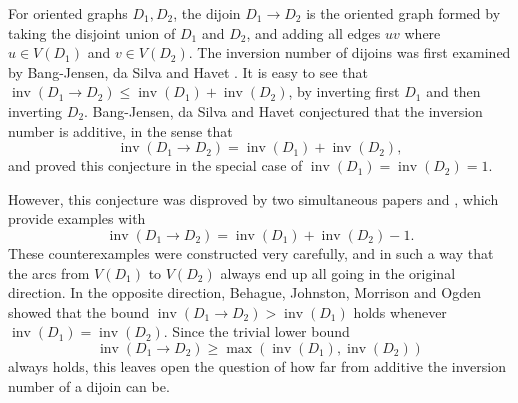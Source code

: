 \documentclass[10pt,a4paper]{amsart}
\numberwithin{equation}{section}
\theoremstyle{plain}
\theoremstyle{remark}
\theoremstyle{definition}
\newcommand{\inv}{\operatorname{inv}}
\begin{document}
For oriented graphs $D_1, D_2$, the dijoin $D_1 \to D_2$ is the oriented graph formed by taking the disjoint union of $D_1$ and $D_2$, and adding all edges $uv$ where $u \in V(D_1)$ and $v \in V(D_2)$. The inversion number of dijoins was first examined by Bang-Jensen, da Silva and Havet \cite{Bang}. It is easy to see that $ \inv(D_1 \to D_2) \leq \inv(D_1) + \inv(D_2)$, by inverting first $D_1$ and then inverting $D_2$. Bang-Jensen, da Silva and Havet \cite{Bang} conjectured that the inversion number is additive, in the sense that
\begin{equation}\label{eq:inv_additivity_conj}
    \inv(D_1 \to D_2) = \inv(D_1) + \inv(D_2),
\end{equation}
and proved this conjecture in the special case of $\inv(D_1) = \inv(D_2) = 1$.

However, this conjecture was disproved by two simultaneous papers \cite{Alon} and \cite{Problems}, which provide examples with
\begin{equation*}
    \inv(D_1 \to D_2) = \inv(D_1) + \inv(D_2) -1.
\end{equation*}
These counterexamples were constructed very carefully, and in such a way that the arcs from $V(D_1)$ to $V(D_2)$ always end up all going in the original direction. In the opposite direction, Behague, Johnston, Morrison and Ogden \cite{Natnote} showed that the bound $\inv(D_1\to D_2)> \inv(D_1)$ holds whenever $\inv(D_1) = \inv(D_2)$. Since the trivial lower bound
\begin{equation*}
    \inv(D_1 \to D_2) \geq \max( \inv(D_1),\inv(D_2))
\end{equation*}
always holds, this leaves open the question of how far from additive the inversion number of a dijoin can be.
\end{document}
